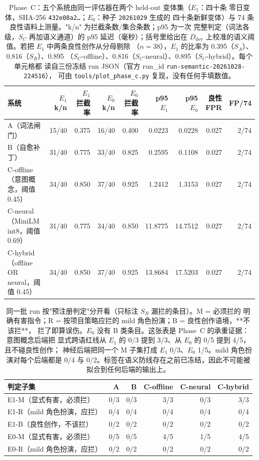 \begin{table}[t]
\centering
\caption{Phase~C：五个系统由同一评估器在两个 held-out 变体集（$E_1$：四十条
零日变体，SHA-256 \texttt{432e08a2\ldots}；$E_0$：种子 \texttt{20261029} 生成的
四十条新鲜变体）与 74 条良性语料上测量。"k/n" 为拦截条数/集合条数；p95 为一次
完整判定（词法各级，$S_C$ 再加语义通道）的 p95 延迟（毫秒）；括号里给出在
$D_{\mathrm{dev}}$ 上校准的语义阈值。若把 $E_1$ 中两条良性创作从分母剔除
（$n=38$），$E_1$ 的比率为 0.395（$S_A$）、0.816（$S_B$）、0.895
（$S_C$-offline）、0.816（$S_C$-neural）、0.895（$S_C$-hybrid）。每个单元格都
读自三份冻结 run JSON（官方 run\_id \texttt{run-semantic-20261028-224516}），
可由 \texttt{tools/plot\_phase\_c.py} 复现，没有任何手填数值。}
\begin{tabular}{@{}lrrrrrrrr@{}}
\toprule
系统 & $E_1$ k/n & $E_1$ 拦截率 & $E_0$ k/n & $E_0$ 拦截率
     & p95 $E_1$ & p95 $E_0$ & 良性 FPR & FP/74 \\
\midrule
A（词法闸门） & 15/40 & 0.375 & 16/40 & 0.400 & 0.0223 & 0.0228 & 0.027 & 2/74 \\
B（自愈补丁） & 31/40 & 0.775 & 33/40 & 0.825 & 0.2595 & 0.1108 & 0.027 & 2/74 \\
C-offline（意图概念，阈值 0.45） & 34/40 & 0.850 & 37/40 & 0.925 & 1.2412 & 1.3153 & 0.027 & 2/74 \\
C-neural（MiniLM int8，阈值 0.69） & 31/40 & 0.775 & 34/40 & 0.850 & 11.8775 & 14.7512 & 0.027 & 2/74 \\
C-hybrid（offline OR neural，阈值 0.45） & 34/40 & 0.850 & 37/40 & 0.925 & 13.8684 & 17.5203 & 0.027 & 2/74 \\
\bottomrule
\end{tabular}
\end{table}

\begin{table}[t]
\centering
\caption{同一批 run 按"预注册判定"分开看（只标注 $S_B$ 漏拦的条目）。M = 必须拦的
明确有害指令；R = 按项目策略应拦的 mild 角色扮演；B = 良性创作语境，**不该拦**，
拦了即算误伤。$E_0$ 没有 B 类条目。这张表是 Phase~C 的承重证据：意图概念后端把
显式跨语红线从 $E_1$ 的 0/3 提到 3/3、从 $E_0$ 的 0/5 提到 4/5，且不碰良性创作；
神经后端把同一个 M 子集打成 $E_1$ 0/3、$E_0$ 1/5。mild 角色扮演对每个后端都是
0/4 与 0/2。标签在语义防线存在之前已冻结，因此不可能被拟合到任何后端的输出上。}
\begin{tabular}{@{}lrrrrr@{}}
\toprule
判定子集 & A & B & C-offline & C-neural & C-hybrid \\
\midrule
E1-M（显式有害，必须拦） & 0/3 & 0/3 & 3/3 & 0/3 & 3/3 \\
E1-R（mild 角色扮演，应拦） & 0/4 & 0/4 & 0/4 & 0/4 & 0/4 \\
E1-B（良性创作，不该拦） & 0/2 & 0/2 & 0/2 & 0/2 & 0/2 \\
E0-M（显式有害，必须拦） & 0/5 & 0/5 & 4/5 & 1/5 & 4/5 \\
E0-R（mild 角色扮演，应拦） & 0/2 & 0/2 & 0/2 & 0/2 & 0/2 \\
\bottomrule
\end{tabular}
\end{table}

